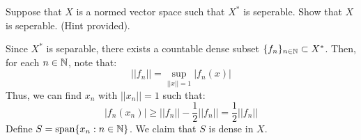 \documentclass[12pt]{article}
\begin{document}
\begin{problem}{41}
    Suppose that $X$ is a normed vector space such that $X^*$ is seperable. Show that $X$ is seperable. (Hint provided).
\end{problem}
\begin{solution} 
    Since $X^*$ is separable, there exists a countable dense subset $\{f_n\}_{n \in \mathbb N} \subset X^*$. Then, for each $n \in \mathbb N$, note that: 
    \[ ||f_n|| = \sup_{||x|| = 1} |f_n(x)|\]
    Thus, we can find $x_n$ with $||x_n|| = 1$ such that: 
    \[ |f_n(x_n)| \geq ||f_n|| - \frac{1}{2}||f_n|| = \frac{1}{2}||f_n||  \]
    Define $S = \operatorname{span}\{x_n : n \in \mathbb N\}$. We claim that $S$ is dense in $X$.

\end{solution}
\newpage 
\end{document}
